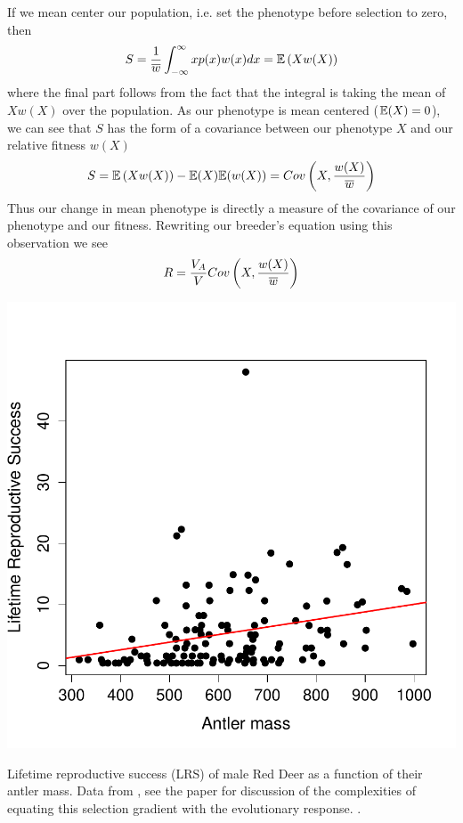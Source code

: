 If we mean center our population, i.e. set the phenotype before
selection to zero, then
\begin{equation}
S= \frac{1}{\overline{w}}\int_{-\infty}^{\infty} x p(x) w(x) dx = \mathbb{E} \left (X
  w(X) \right)
\end{equation}
where the final part follows from the fact that the integral is taking
the mean of $X w(X)$ over the population. 
As our phenotype is mean centered ($\mathbb{E}(X)=0$), we can see that $S$ has
the form of a covariance between our phenotype $X$ and our relative fitness
$w(X)$
\begin{equation}
  S =  \mathbb{E} \left (X
  w(X) \right) -\mathbb{E}(X)\mathbb{E}(w(X)) =Cov \left(X, \frac{w(X)}{\overline{w}} \right) \label{S_covar}
\end{equation}
  Thus our change in mean phenotype is directly a measure of the
covariance of our phenotype and our fitness. Rewriting our breeder's
equation using this observation we see
\begin{equation}
R = \frac{V_A}{V}  Cov \left(X, \frac{w(X)}{\overline{w}} \right)  
\end{equation}

\begin{marginfigure}
\begin{center}
\includegraphics[width= \textwidth]{Journal_figs/Quant_gen/red_deer_selection_gradient/selection_grad_deer.pdf}
\end{center}
\caption{Lifetime reproductive success (LRS) of male Red Deer as a
  function of their antler mass. Data from \citet{kruuk2002antler},
  see the paper for discussion of the complexities of equating this
  selection gradient with the evolutionary response. . } \label{fig:red_deer_fitness_grad}  
\end{marginfigure}

